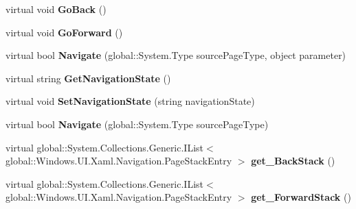 \begin{DoxyCompactItemize}
\item 
\mbox{\label{class_windows_1_1_u_i_1_1_xaml_1_1_controls_1_1_frame_aa208a306e405ff8aad9dc0a19d722b18}} 
virtual void {\bfseries Go\+Back} ()
\item 
\mbox{\label{class_windows_1_1_u_i_1_1_xaml_1_1_controls_1_1_frame_a77897d1c6e165763d79d0444353627b6}} 
virtual void {\bfseries Go\+Forward} ()
\item 
\mbox{\label{class_windows_1_1_u_i_1_1_xaml_1_1_controls_1_1_frame_aa88f5dbc5d0be1aa7a6d29db649b5d3b}} 
virtual bool {\bfseries Navigate} (global\+::\+System.\+Type source\+Page\+Type, object parameter)
\item 
\mbox{\label{class_windows_1_1_u_i_1_1_xaml_1_1_controls_1_1_frame_a61a9544723df665a3302a9c9787d26e5}} 
virtual string {\bfseries Get\+Navigation\+State} ()
\item 
\mbox{\label{class_windows_1_1_u_i_1_1_xaml_1_1_controls_1_1_frame_ad11b0d06a73306aa6bdb716ba217bf42}} 
virtual void {\bfseries Set\+Navigation\+State} (string navigation\+State)
\item 
\mbox{\label{class_windows_1_1_u_i_1_1_xaml_1_1_controls_1_1_frame_a1ba0f46855026734880083781db1286b}} 
virtual bool {\bfseries Navigate} (global\+::\+System.\+Type source\+Page\+Type)
\item 
\mbox{\label{class_windows_1_1_u_i_1_1_xaml_1_1_controls_1_1_frame_a80ca191b072efed7111ea58c25416f2e}} 
virtual global\+::\+System.\+Collections.\+Generic.\+I\+List$<$ global\+::\+Windows.\+U\+I.\+Xaml.\+Navigation.\+Page\+Stack\+Entry $>$ {\bfseries get\+\_\+\+Back\+Stack} ()
\item 
\mbox{\label{class_windows_1_1_u_i_1_1_xaml_1_1_controls_1_1_frame_ae329d75ad7803db9b56a1087833db051}} 
virtual global\+::\+System.\+Collections.\+Generic.\+I\+List$<$ global\+::\+Windows.\+U\+I.\+Xaml.\+Navigation.\+Page\+Stack\+Entry $>$ {\bfseries get\+\_\+\+Forward\+Stack} ()

\end{DoxyCompactItemize}
